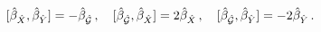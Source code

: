 \begin{equation}
\lbrack \hat{\beta}_{\hat{X}},\hat{\beta}_{\hat{Y}}]=-\hat{\beta}_{\mathcal{%
\hat{G}}}\,,\quad \lbrack \hat{\beta}_{\mathcal{\hat{G}}},\hat{\beta}_{\hat{X%
}}]=2\hat{\beta}_{\hat{X}}\,,\quad \lbrack \hat{\beta}_{\mathcal{\hat{G}}},%
\hat{\beta}_{\hat{Y}}]=-2\hat{\beta}_{\hat{Y}}\,.
\end{equation}

